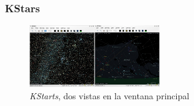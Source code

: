 \subsubsection{KStars}
% 
% 
% 
% 
% 

\begin{figure}[!htb]
    \centering
    \includegraphics[width=0.5\textwidth]{img/kstars}
    \caption{\emph{KStarts}, dos vistas en la ventana principal}
    \label{fig:kstars}
\end{figure}

